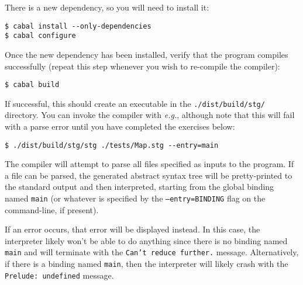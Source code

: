 \documentclass[10pt,a4paper]{exam} %
\begin{document}
\begin{mdframed}
There is a new dependency, so you will need to install it:
\begin{verbatim}
$ cabal install --only-dependencies
$ cabal configure
\end{verbatim}
Once the new dependency has been installed, verify that the program compiles successfully (repeat this step whenever you wish to re-compile the compiler):
\begin{verbatim}
$ cabal build
\end{verbatim}
If successful, this should create an executable in the \texttt{./dist/build/stg/} directory. You can invoke the compiler with \emph{e.g.}, although note that this will fail with a parse error until you have completed the exercises below:
\begin{verbatim}
$ ./dist/build/stg/stg ./tests/Map.stg --entry=main
\end{verbatim} 
The compiler will attempt to parse all files specified as inputs to the program. If a file can be parsed, the generated abstract syntax tree will be pretty-printed to the standard output and then interpreted, starting from the global binding named \texttt{main} (or whatever is specified by the \texttt{--entry=BINDING} flag on the command-line, if present).

If an error occurs, that error will be displayed instead. In this case, the interpreter likely won't be able to do anything since there is no binding named \texttt{main} and will terminate with the \texttt{Can't reduce further.} message. Alternatively, if there is a binding named \texttt{main}, then the interpreter will likely crash with the \texttt{Prelude: undefined} message.
\end{mdframed}
\end{document}
